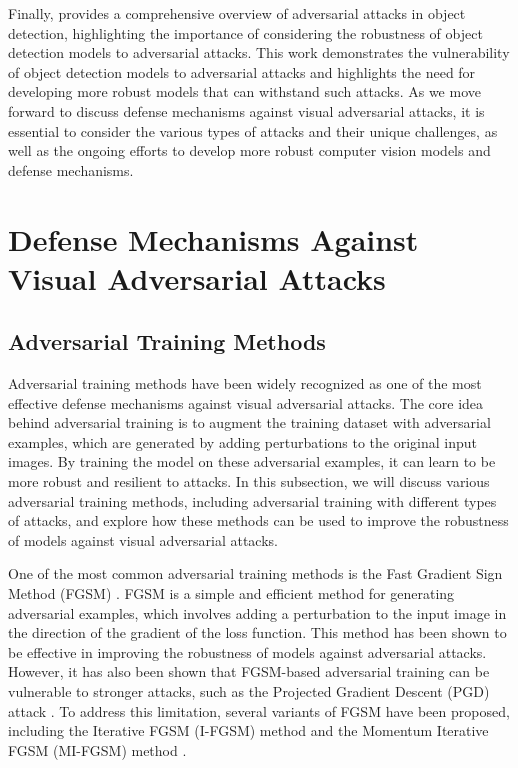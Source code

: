 \documentclass[11pt]{article}
\begin{document}
Finally, \cite{ref95} provides a comprehensive overview of adversarial attacks in object detection, highlighting the importance of considering the robustness of object detection models to adversarial attacks. This work demonstrates the vulnerability of object detection models to adversarial attacks and highlights the need for developing more robust models that can withstand such attacks. As we move forward to discuss defense mechanisms against visual adversarial attacks, it is essential to consider the various types of attacks and their unique challenges, as well as the ongoing efforts to develop more robust computer vision models and defense mechanisms.

\section{Defense Mechanisms Against Visual Adversarial Attacks}

\subsection{Adversarial Training Methods}

Adversarial training methods have been widely recognized as one of the most effective defense mechanisms against visual adversarial attacks. The core idea behind adversarial training is to augment the training dataset with adversarial examples, which are generated by adding perturbations to the original input images. By training the model on these adversarial examples, it can learn to be more robust and resilient to attacks. In this subsection, we will discuss various adversarial training methods, including adversarial training with different types of attacks, and explore how these methods can be used to improve the robustness of models against visual adversarial attacks.

One of the most common adversarial training methods is the Fast Gradient Sign Method (FGSM) \cite{ref96}. FGSM is a simple and efficient method for generating adversarial examples, which involves adding a perturbation to the input image in the direction of the gradient of the loss function. This method has been shown to be effective in improving the robustness of models against adversarial attacks. However, it has also been shown that FGSM-based adversarial training can be vulnerable to stronger attacks, such as the Projected Gradient Descent (PGD) attack \cite{ref97}. To address this limitation, several variants of FGSM have been proposed, including the Iterative FGSM (I-FGSM) method \cite{ref98} and the Momentum Iterative FGSM (MI-FGSM) method \cite{ref30}.
\end{document}

